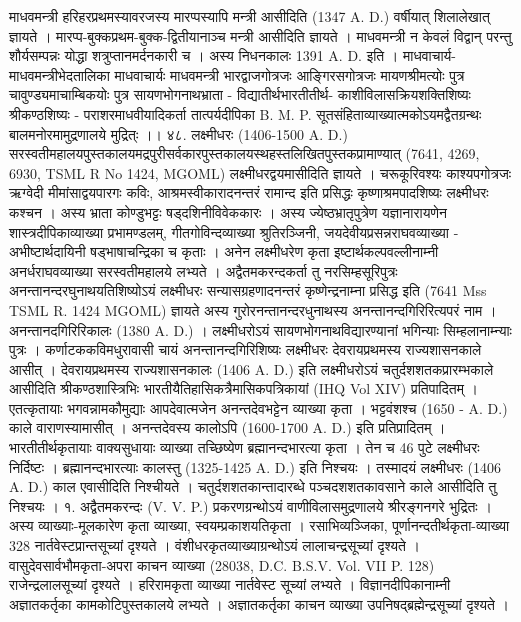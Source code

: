 माधवमन्त्री हरिहरप्रथमस्यावरजस्य मारप्पस्यापि मन्त्री आसीदिति (1347 A. D.) वर्षीयात् शिलालेखात् ज्ञायते । मारप्प-बुक्कप्रथम-बुक्क-द्वितीयानाञ्च मन्त्री आसीदिति ज्ञायते । माधवमन्त्री न केवलं विद्वान् परन्तु शौर्यसम्पन्नः योद्धा शत्रुप्तानमर्दनकारी च । अस्य निधनकालः  1391 A. D. इति ।
माधवाचार्य-माधवमन्त्रीभेदतालिका
माधवाचार्यः			माधवमन्त्री
भारद्वाजगोत्रजः					आङ्गिरसगोत्रजः
मायणश्रीमत्योः पुत्र					चावुण्ड्यमाचाम्बिकयोः पुत्र
सायणभोगनाथभ्राता						-
विद्यातीर्थभारतीतीर्थ-					काशीविलासक्रियशक्तिशिष्यः
श्रीकण्ठशिष्यः							-
पराशरमाधवीयादिकर्ता				तात्पर्यदीपिका B. M. P.
सूतसंहिताव्याख्यात्मकोऽयमद्वैतग्रन्थः 	बालमनोरमामुद्रणालये मुद्रित्ः ।।
४८. लक्ष्मीधरः (1406-1500 A. D.)
सरस्वतीमहालयपुस्तकालयमद्रपुरीसर्वकारपुस्तकालयस्थहस्तलिखितपुस्तकप्रामाण्यात् (7641, 4269, 6930, TSML R No 1424, MGOML) लक्ष्मीधरद्वयमासीदिति ज्ञायते । चरूकूरिवश्यः काश्यपगोत्रजः ऋग्वेदी मीमांसाद्वयपारगः कविः, आश्रमस्वीकारादनन्तरं रामान्द इति प्रसिद्धः कृष्णाश्रमपादशिष्यः लक्ष्मीधरः कश्चन । अस्य भ्राता कोण्डुभट्टः षड्दशिनीविवेककारः । अस्य ज्येष्ठभ्रातृपुत्रेण यज्ञानारायणेन शास्त्रदीपिकाव्याख्या प्रभामण्डलम्, गीतगोविन्दव्याख्या श्रुतिरञ्जिनी, जयदेवीयप्रसन्नराघवव्याख्या - अभीष्टार्थदायिनी षड्भाषाचन्द्रिका च कृताः । अनेन लक्ष्मीधरेण कृता इष्टार्थकल्पवल्लीनाम्नी अनर्धराघवव्याख्या सरस्वतीमहालये लभ्यते ।
अद्वैतमकरन्दकर्ता तु नरसिम्हसूरिपुत्रः अनन्तानन्दरघुनाथयतिशिष्योऽयं लक्ष्मीधरः सन्यासग्रहणादनन्तरं कृष्णेन्द्रनाम्ना प्रसिद्ध इति (7641 Mss TSML R. 1424 MGOML) ज्ञायते अस्य गुरोरनन्तानन्दरधुनाथस्य अनन्तानन्दगिरिरित्यपरं नाम । अनन्तानदगिरिरिकालः (1380 A. D.) । लक्ष्मीधरोऽयं सायणभोगनाथविद्यारण्यानां भगिन्याः सिम्हलानाम्न्याः पुत्रः । कर्णाटककविमधुरावासी चायं अनन्तानन्दगिरिशिष्यः लक्ष्मीधरः देवरायप्रथमस्य राज्यशासनकाले आसीत् । देवरायप्रथमस्य राज्यशासनकालः (1406 A. D.) इति लक्ष्मीधरोऽयं चतुर्दशशतकप्रारम्भकाले आसीदिति श्रीकण्ठशास्त्रिभिः भारतीयैतिहासिकत्रैमासिकपत्रिकायां (IHQ Vol XIV) प्रतिपादितम् ।
एतत्कृतायाः भगवन्नामकौमुद्याः आपदेवात्मजेन अनन्तदेवभट्टेन व्याख्या कृता । भट्टवंशश्च (1650 - A. D.) काले वाराणस्यामासीत् । अनन्तदेवस्य कालोऽपि (1600-1700 A. D.) इति प्रतिप्रादितम् । भारतीतीर्थकृतायाः वाक्यसुधायाः व्याख्या तच्छिष्येण ब्रह्मानन्दभारत्या कृता । तेन च 46 पुटे लक्ष्मीधरः निर्दिष्टः । ब्रह्मानन्दभारत्याः कालस्तु (1325-1425 A. D.) इति निश्चयः । तस्मादयं लक्ष्मीधरः (1406 A. D.) काल एवासीदिति निश्चीयते । चतुर्दशशतकान्तादारब्धे पञ्चदशशतकावसाने काले आसीदिति तु निश्चयः ।
१. अद्वैतमकरन्दः (V. V. P.)
प्रकरणग्रन्थोऽयं वाणीविलासमुद्रणालये श्रीरङ्गनगरे भुद्रितः । अस्य व्याख्याः-मूलकारेण कृता व्याख्या, स्वयम्प्रकाशयतिकृता । रसाभिव्यञ्जिका, पूर्णानन्दतीर्थकृता-व्याख्या 328 नार्तवेस्टप्रान्तसूच्यां दृश्यते । वंशीधरकृतव्याख्याग्रन्थोऽयं लालाचन्द्रसूच्यां दृश्यते । वासुदेवसार्वभौमकृता-अपरा काचन व्याख्या (28038, D.C. B.S.V. Vol. VII P. 128) राजेन्द्रलालसूच्यां दृश्यते । हरिरामकृता व्याख्या नार्तवेस्ट सूच्यां लभ्यते । विज्ञानदीपिकानाम्नी अज्ञातकर्तृका कामकोटिपुस्तकालये लभ्यते । अज्ञातकर्तृका काचन व्याख्या उपनिषद्ब्रह्मेन्द्रसूच्यां दृश्यते ।
